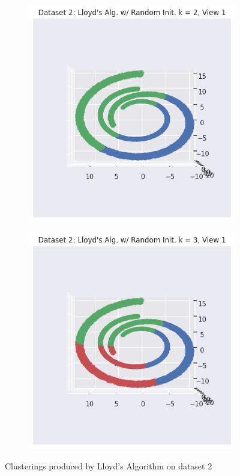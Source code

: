 \documentclass[12pt]{article}
\begin{document}
\begin{figure}[ht]
  \centering
  \begin{subfigure}{0.45\textwidth}
    \centering
    \includegraphics[width=\linewidth]{9.png}
    \label{fig:16}
  \end{subfigure}%
  \vspace{1em} %
  \begin{subfigure}{0.45\textwidth}
    \centering
    \includegraphics[width=\linewidth]{12.png}
    \label{fig:19}
  \end{subfigure}%
  \caption{Clusterings produced by Lloyd's Algorithm on dataset 2}
  \label{fig:dist_2}
\end{figure}
\end{document}
